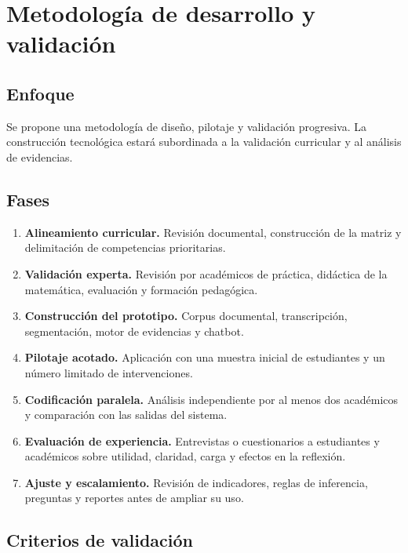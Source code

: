 \documentclass[11pt,a4paper]{article}
\begin{document}
\section{Metodología de desarrollo y validación}

\subsection{Enfoque}

Se propone una metodología de diseño, pilotaje y validación progresiva. La construcción tecnológica estará subordinada a la validación curricular y al análisis de evidencias.

\subsection{Fases}

\begin{enumerate}
    \item \textbf{Alineamiento curricular.} Revisión documental, construcción de la matriz y delimitación de competencias prioritarias.
    \item \textbf{Validación experta.} Revisión por académicos de práctica, didáctica de la matemática, evaluación y formación pedagógica.
    \item \textbf{Construcción del prototipo.} Corpus documental, transcripción, segmentación, motor de evidencias y chatbot.
    \item \textbf{Pilotaje acotado.} Aplicación con una muestra inicial de estudiantes y un número limitado de intervenciones.
    \item \textbf{Codificación paralela.} Análisis independiente por al menos dos académicos y comparación con las salidas del sistema.
    \item \textbf{Evaluación de experiencia.} Entrevistas o cuestionarios a estudiantes y académicos sobre utilidad, claridad, carga y efectos en la reflexión.
    \item \textbf{Ajuste y escalamiento.} Revisión de indicadores, reglas de inferencia, preguntas y reportes antes de ampliar su uso.
\end{enumerate}

\subsection{Criterios de validación}
\end{document}
